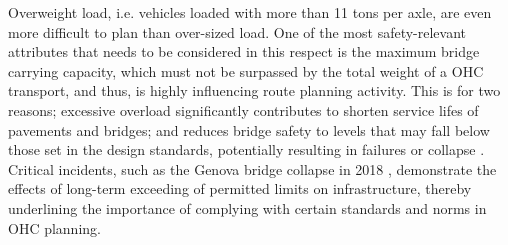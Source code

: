 Overweight load, i.e. vehicles loaded with more than 11 tons per axle, are even more difficult to plan than over-sized load.
One of the most safety-relevant attributes that needs to be considered in this respect is the maximum bridge carrying capacity, which must not be surpassed by the total weight of a OHC transport, and thus, is highly influencing route planning activity.
This is for two reasons; excessive overload significantly contributes to shorten service lifes of pavements and bridges; and reduces bridge safety to levels that may fall below those set in the design standards, potentially resulting in failures or collapse \cite{fiorillo2018fragility}.
Critical incidents, such as the Genova bridge collapse in 2018 \cite{Morgese.2020, MorandiNYTimes},  demonstrate the effects of long-term exceeding of permitted limits on infrastructure, thereby underlining the importance of complying with certain standards and norms in OHC planning.

